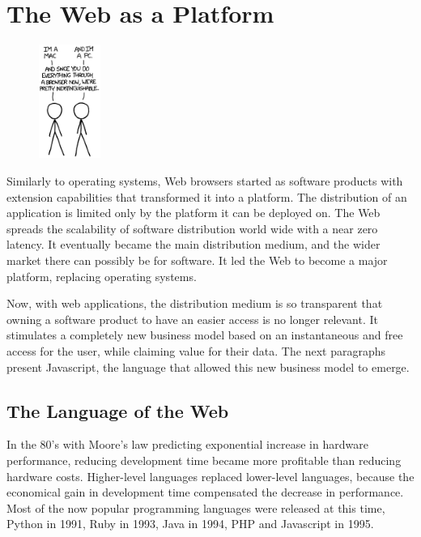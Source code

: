 \section{The Web as a Platform} \label{chapter2:web-as-a-platform}

\begin{figure}
  \vspace{-27pt}
  \begin{center}
    \includegraphics[width=0.18\textwidth]{../resources/Mac-PC.png}
  \end{center}
  \vspace{-20pt}
\end{figure}

Similarly to operating systems, Web browsers started as software products with extension capabilities that transformed it into a platform. %
The distribution of an application is limited only by the platform it can be deployed on.
The Web spreads the scalability of software distribution world wide with a near zero latency.
It eventually became the main distribution medium, and the wider market there can possibly be for software.
It led the Web to become a major platform, replacing operating systems.

Now, with web applications, the distribution medium is so transparent that owning a software product to have an easier access is no longer relevant.
It stimulates a completely new business model based on an instantaneous and free access for the user, while claiming value for their data.
The next paragraphs present Javascript, the language that allowed this new business model to emerge.

\subsection{The Language of the Web}

In the 80's with Moore's law predicting exponential increase in hardware performance, reducing development time became more profitable than reducing hardware costs.
Higher-level languages replaced lower-level languages, because the economical gain in development time compensated the decrease in performance.
Most of the now popular programming languages were released at this time, Python in 1991, Ruby in 1993, Java in 1994, PHP and Javascript in 1995.

